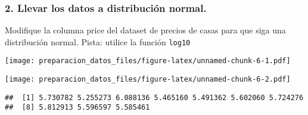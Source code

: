 \documentclass[]{article}
\newenvironment{Shaded}{\begin{snugshade}}{\end{snugshade}}
\newcommand{\CommentTok}[1]{\textcolor[rgb]{0.56,0.35,0.01}{\textit{#1}}}
\newcommand{\DataTypeTok}[1]{\textcolor[rgb]{0.13,0.29,0.53}{#1}}
\newcommand{\DecValTok}[1]{\textcolor[rgb]{0.00,0.00,0.81}{#1}}
\newcommand{\KeywordTok}[1]{\textcolor[rgb]{0.13,0.29,0.53}{\textbf{#1}}}
\newcommand{\NormalTok}[1]{#1}
\newcommand{\OperatorTok}[1]{\textcolor[rgb]{0.81,0.36,0.00}{\textbf{#1}}}
\newcommand{\StringTok}[1]{\textcolor[rgb]{0.31,0.60,0.02}{#1}}
\begin{document}
\hypertarget{llevar-los-datos-a-distribucion-normal.}{%
\subsubsection{2. Llevar los datos a distribución
normal.}\label{llevar-los-datos-a-distribucion-normal.}}

Modifique la columna price del dataset de precios de casas para que siga
una distribución normal. Pista: utilice la función \texttt{log10}

\begin{Shaded}
\end{Shaded}

\texttt{[image: preparacion\_datos\_files/figure-latex/unnamed-chunk-6-1.pdf]}

\begin{Shaded}
\end{Shaded}

\texttt{[image: preparacion\_datos\_files/figure-latex/unnamed-chunk-6-2.pdf]}

\begin{Shaded}
\end{Shaded}

\begin{verbatim}
##  [1] 5.730782 5.255273 6.088136 5.465160 5.491362 5.602060 5.724276
##  [8] 5.812913 5.596597 5.585461
\end{verbatim}
\end{document}
